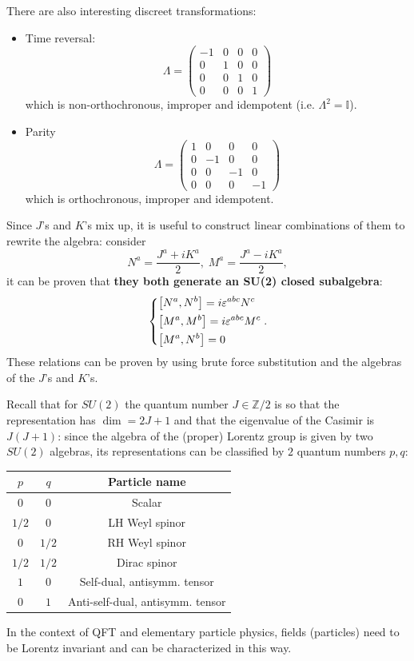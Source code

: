 There are also interesting discreet transformations:
\begin{itemize}
\item Time reversal:
    \[
        \Lambda=\begin{pmatrix}
            -1&0&0&0\\
            0&1&0&0\\
            0&0&1&0\\
            0&0&0&1
        \end{pmatrix}
    \]
    which is non-orthochronous, improper and idempotent (i.e. $\Lambda^2=\mathbb
    {I}$).
\item Parity
    \[
        \Lambda=\begin{pmatrix}
            1&0&0&0\\
            0&-1&0&0\\
            0&0&-1&0\\
            0&0&0&-1        
        \end{pmatrix}   
    \]
    which is orthochronous, improper and idempotent.
\end{itemize}

Since $J$'s and $K$'s mix up, it is useful to construct linear combinations of
them to rewrite the algebra: consider
\[
    N^a = \frac{J^a+iK^a}{2},\;M^a = \frac{J^a-iK^a}{2},
\]
it can be proven that \textbf{they both generate an SU(2) closed subalgebra}:
\[
    \begin{dcases*}
        \left[N^a,N^b\right] = i\varepsilon^{abc}N^c\\ 
        \left[M^a,M^b\right] = i\varepsilon^{abc}M^c\\
        \left[M^a,N^b\right] = 0
    \end{dcases*}.
\] 
These relations can be proven by using brute force substitution and the
algebras of the $J$'s and $K$'s.

Recall that for $SU(2)$ the quantum number $J\in\mathbb{Z}/2$ is so that the
representation has
$\dim = 2J+1$ and that the eigenvalue of the Casimir is $J(J+1)$: since
the algebra of the (proper) Lorentz group is given by two $SU(2)$ algebras,
its representations can be classified by $2$ quantum numbers $p,q$:
\begin{table}[H]
    \centering
    \begin{tabular}{|c|c|c|}\hline
        $p$&$q$&Particle name\\\hline
        $0$&$0$&Scalar\\\hline
        $1/2$&$0$&LH Weyl spinor\\\hline
        $0$&$1/2$&RH Weyl spinor\\\hline
        $1/2$&$1/2$&Dirac spinor\\\hline
        $1$&$0$&Self-dual, antisymm. tensor\\\hline
        $0$&$1$&Anti-self-dual, antisymm. tensor\\\hline
    \end{tabular}
\end{table}
In the context of QFT and elementary particle physics, fields (particles) need
to be Lorentz invariant and can be characterized in this way.

